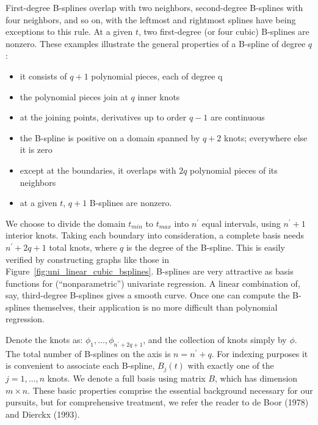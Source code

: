 \documentclass[12pt]{article}
\begin{document}
First-degree B-splines overlap with two neighbors, second-degree B-splines with four neighbors, and so on, with the leftmost and rightmost splines have being exceptions to this rule. At a given $t$, two first-degree (or four cubic) B-splines are nonzero. These examples illustrate the general properties of a B-spline of degree $q$:

\begin{itemize}
\item it consists of $q + 1$ polynomial pieces, each of degree q\\
\item the polynomial pieces join at $q$ inner knots\\
\item at the joining points, derivatives up to order $q - 1$ are continuous\\
\item the B-spline is positive on a domain spanned by $q +2$ knots; everywhere else it is zero\\
\item except at the boundaries, it overlaps with $2q$ polynomial pieces of its neighbors\\
\item at a given $t$, $q +1$ B-splines are nonzero.
\end{itemize}

We choose to divide the domain $t_{min}$ to $t_{max}$ into $n^\prime$ equal intervals, using $n^\prime +1$ interior knots. Taking each boundary into consideration, a complete basis needs $n^\prime + 2q + 1$ total knots, where $q$ is the degree of the B-spline. This is easily verified by constructing graphs like those in Figure~\ref{fig:uni_linear_cubic_bsplines}. B-splines are very attractive as basis functions for (``nonparametric'') univariate regression. A linear combination of, say, third-degree B-splines gives a smooth curve. Once one can compute the B-splines themselves, their application is no more difficult than polynomial regression.

Denote the knots as: $\phi_1,\dots ,\phi_{n^\prime+2q+1}$, and the collection of knots simply by $\phi$. The total number of B-splines on the axis is $n = n^\prime + q$. For indexing purposes it is convenient to associate each B-spline, $B_j\left(t\right)$ with exactly one of the $j = 1, \dots , n$ knots. We denote a full basis using matrix $B$, which has dimension $m \times n$. These basic properties comprise the essential background necessary for our pursuits, but for comprehensive treatment, we refer the reader to de Boor (1978) and Dierckx (1993).
\end{document}
